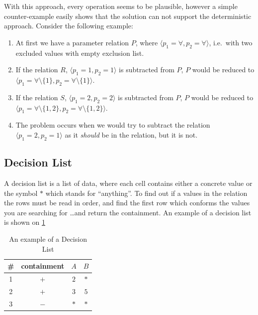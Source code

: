 	With this approach, every operation seems to be plausible, however a simple counter-example easily shows that the solution can not support the deterministic approach.
	Consider the following example:
	\begin{enumerate}
		\item At first we have a parameter relation $P$, where $\langle p_1 = \forall, p_2 = \forall \rangle$, i.e.~with two excluded values with empty exclusion list.
		\item If the relation $R$, $\langle p_1 = 1, p_2 = 1 \rangle$ is subtracted from $P$, $P$ would be reduced to $\langle p_1 = \forall \setminus \{1\}, p_2 = \forall \setminus \{1\} \rangle$.
		\item If the relation $S$, $\langle p_1 = 2, p_2 = 2 \rangle$ is subtracted from $P$, $P$ would be reduced to $\langle p_1 = \forall \setminus \{1, 2\}, p_2 = \forall \setminus \{1, 2\} \rangle$.
		\item The problem occurs when we would try to subtract the relation $\langle p_1 = 2, p_2 = 1 \rangle$ as it \emph{should} be in the relation, but it is not. 
	\end{enumerate}

	\subsection{Decision List}
	
	A decision list is a list of data, where each cell contains either a concrete value or the symbol $\ast$ which stands
	for ``anything''. To find out if a values in the relation the rows must be read in order, and find the first row which conforms the values you are searching for  \dots and return the containment.
	An example of a decision list is shown on \cref{tab:cep:decision_list}
	
	\begin{table}
		\centering
		\caption{An example of a Decision List}		
		\label{tab:cep:decision_list}
		\begin{tabular}{cccc}
			\toprule
			\# & containment &  $A$   &  $B$   \\ \midrule
			1  &     $+$     &  $2$   & $\ast$ \\
			2  &     $+$     &  $3$   &  $5$   \\
			3  &     $-$     & $\ast$ & $\ast$ \\ \bottomrule
		\end{tabular}
	\end{table}

